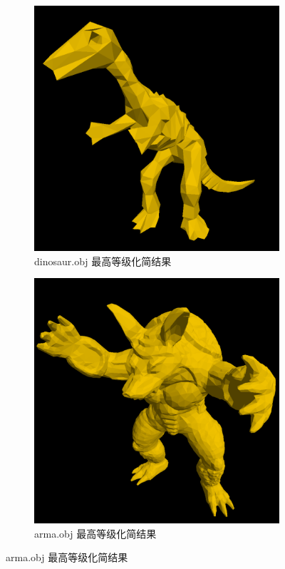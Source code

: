 \documentclass[UTF8]{ctexart}
\begin{document}
\begin{figure}[h]
    \begin{subfigure}[b]{0.48\textwidth}
        \centering
        \includegraphics[height=0.3\textheight]{images/3-1.png}
        \caption{dinosaur.obj 最高等级化简结果}
    \end{subfigure}
    \hfill
    \begin{subfigure}[b]{0.48\textwidth}
        \centering
        \includegraphics[height=0.3\textheight]{images/3-2.png}
        \caption{arma.obj 最高等级化简结果}
    \end{subfigure}
\end{figure}
\end{document}
